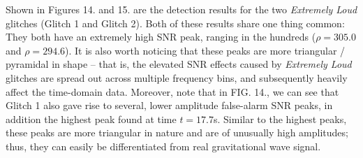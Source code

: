 \documentclass[reprint,
letterpaper,
 amsmath,amssymb,
 aps,
]{revtex4-2}
\begin{document}
Shown in Figures 14. and 15. are the detection results for the two \textit{Extremely Loud} glitches (Glitch 1 and Glitch 2). Both of these results share one thing common: They both have an extremely high SNR peak, ranging in the hundreds ($\rho=305.0$ and $\rho=294.6$). It is also worth noticing that these peaks are more triangular / pyramidal in shape – that is, the elevated SNR effects caused by \textit{Extremely Loud} glitches are spread out across multiple frequency bins, and subsequently heavily affect the time-domain data. Moreover, note that in FIG. 14., we can see that Glitch 1 also gave rise to several, lower amplitude false-alarm SNR peaks, in addition the highest peak found at time $t=17.7$s. Similar to the highest peaks, these peaks are more triangular in nature and are of unusually high amplitudes; thus, they can easily be differentiated from real gravitational wave signal.
\end{document}
